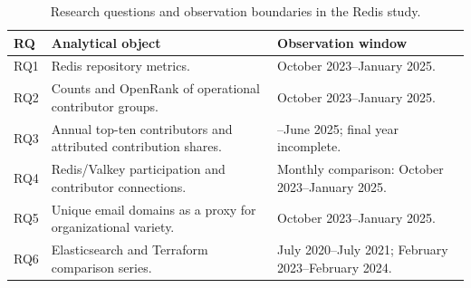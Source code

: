 \begin{table}[tbp]
\caption{Research questions and observation boundaries in the Redis study.}
\label{tab:ch9-design}
\centering\small\renewcommand{\arraystretch}{1.14}
\begin{tabularx}{\linewidth}{@{}>{\raggedright\arraybackslash}p{12mm}>{\raggedright\arraybackslash}X>{\raggedright\arraybackslash}p{45mm}@{}}\toprule
RQ & Analytical object & Observation window \\\midrule
RQ1 & Redis repository metrics. & October 2023--January 2025.\\
RQ2 & Counts and OpenRank of operational contributor groups. & October 2023--January 2025.\\
RQ3 & Annual top-ten contributors and attributed contribution shares. & 2017--June 2025; final year incomplete.\\
RQ4 & Redis/Valkey participation and contributor connections. & Monthly comparison: October 2023--January 2025.\\
RQ5 & Unique email domains as a proxy for organizational variety. & October 2023--January 2025.\\
RQ6 & Elasticsearch and Terraform comparison series. & July 2020--July 2021; February 2023--February 2024.\\\bottomrule
\end{tabularx}
\end{table}
